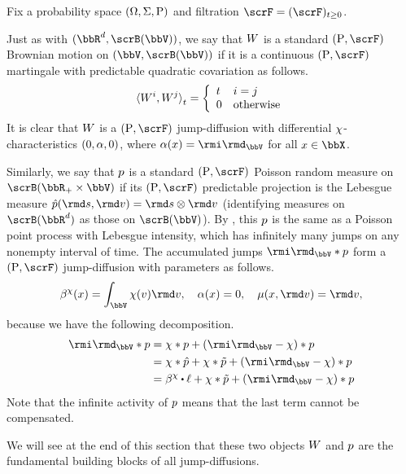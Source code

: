 \begin{example}
  \label{example:jump-diffusion-drivers}
  Fix a probability space $(\Omega, \Sigma, {\operatorname{P}})$ and filtration $\scrF=(\scrF)_{t\geq0}$. 

  Just as with $(\bbR^d, \scrB(\vecSpace))$, we say that $W$ is a standard $(\Prb, \scrF)$ Brownian motion on $(\vecSpace, \scrB(\vecSpace))$ if it is a continuous $(\Prb, \scrF)$ martingale with predictable quadratic covariation as follows.
  \begin{equation*}
    {\langle W^i , W^j \rangle}_t = \left\{\begin{array}{ll}
      t & i = j \\
      0 & \text{otherwise}
    \end{array}\right.
  \end{equation*}
  It is clear that $W$ is a $(\Prb, \scrF)$ jump-diffusion with differential $\chi$-characteristics $(0, \alpha, 0)$, where $\affDiff(\stateVar) = \id_\vecSpace$ for all $\stateVar \in \stateSpace$.

  Similarly, we say that $p$ is a standard $(\Prb, \scrF)$ Poisson random measure on $\scrB(\bbR_+ \times \vecSpace)$ if its $(\Prb, \scrF)$ predictable projection is the Lebesgue measure $\predproj{\poisRM}(\rmd s, \rmd\markVar) = \rmd s \otimes \rmd\markVar$ (identifying measures on $\scrB(\bbR^d)$ as those on $\scrB(\vecSpace)$).
  By \cite[Theorem II.4.8]{jacod2003}, this $p$ is the same as a Poisson point process with Lebesgue intensity, which has infinitely many jumps on any nonempty interval of time.
  The accumulated jumps $\id_\vecSpace \ast \poisRM$ form a $(\Prb, \scrF)$ jump-diffusion with parameters as follows.
  \[
    \affDrift^\trunc(\stateVar) = \int_\vecSpace \trunc(\markVar) \rmd\markVar, \quad
    \affDiff(\stateVar) = 0, \quad
    \affJump(\stateVar, \rmd\markVar) = \rmd \markVar,
  \]
  because we have the following decomposition.
  \begin{align*}
    \id_\vecSpace \ast \poisRM 
    &= \trunc \ast \poisRM + (\id_\vecSpace - \trunc) \ast \poisRM  \\
    &= \trunc \ast \predproj{\poisRM} + \trunc\ast\compensate{\poisRM} + (\id_\vecSpace - \trunc) \ast \poisRM  \\
    &= \affDrift^\trunc \shortInt \leb + \trunc \ast \compensate{\poisRM} + (\id_\vecSpace - \trunc) \ast \poisRM
  \end{align*}
  Note that the infinite activity of $p$ means that the last term cannot be compensated.

  We will see at the end of this section that these two objects $W$ and $p$ are the fundamental building blocks of all jump-diffusions.
\end{example}

